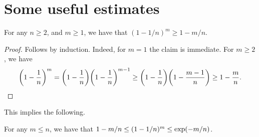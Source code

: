 %

\ChapterPrefix{}
\ChapterGen{}

\section{Some useful estimates}

\begin{lemma}
    For any $n \geq 2$, and $m \geq 1$, we have that $(1-1/n)^m\geq 1
    - m/n$.
\end{lemma}
\begin{proof}
    Follows by induction. Indeed, for $m=1$ the claim is
    immediate. For $m \geq 2$, we have
    \begin{align*}
        \pth{1-\frac{1}{n}}^m%
        =%
        \pth[]{1-\frac{1}{n}} \pth[]{1-\frac{1}{n}}^{m-1}%
        \geq%
        \pth[]{1-\frac{1}{n}}\pth[]{ 1 - \frac{m-1}{n}} \geq%
        1 - \frac{m}{n}.
    \end{align*}
\end{proof}

This implies the following.

\begin{lemma}
    For any $m\leq n$, we have that $1-m/n \leq (1-1/n)^m \leq
    \exp\pth{-m/n}$.
\end{lemma}

\ChapterEnd{}


